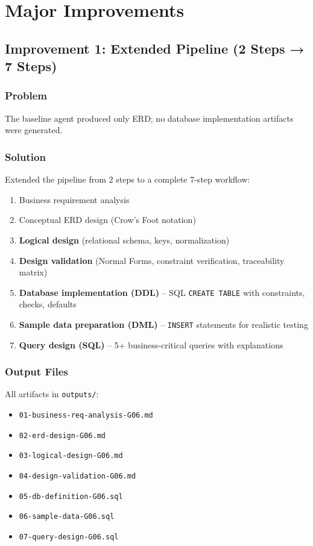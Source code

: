 \documentclass[12pt,a4paper]{article}
\begin{document}
\newpage

\section{Major Improvements}

\subsection{Improvement 1: Extended Pipeline (2 Steps → 7 Steps)}

\subsubsection{Problem}
The baseline agent produced only ERD; no database implementation artifacts were generated.

\subsubsection{Solution}
Extended the pipeline from 2 steps to a complete 7-step workflow:

\begin{enumerate}
    \item Business requirement analysis
    \item Conceptual ERD design (Crow's Foot notation)
    \item \textbf{Logical design} (relational schema, keys, normalization)
    \item \textbf{Design validation} (Normal Forms, constraint verification, traceability matrix)
    \item \textbf{Database implementation (DDL)} -- SQL \texttt{CREATE TABLE} with constraints, checks, defaults
    \item \textbf{Sample data preparation (DML)} -- \texttt{INSERT} statements for realistic testing
    \item \textbf{Query design (SQL)} -- 5+ business-critical queries with explanations
\end{enumerate}

\subsubsection{Output Files}
All artifacts in \texttt{outputs/}:
\begin{itemize}
    \item \texttt{01-business-req-analysis-G06.md}
    \item \texttt{02-erd-design-G06.md}
    \item \texttt{03-logical-design-G06.md}
    \item \texttt{04-design-validation-G06.md}
    \item \texttt{05-db-definition-G06.sql}
    \item \texttt{06-sample-data-G06.sql}
    \item \texttt{07-query-design-G06.sql}
\end{itemize}
\end{document}
